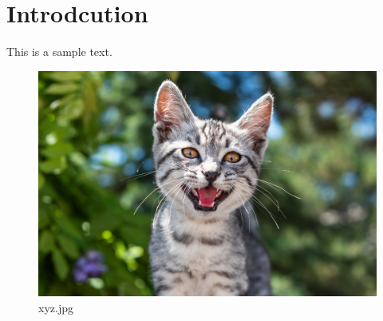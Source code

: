 \chapter{Introdcution}This is a sample text.
\begin{figure}[htpb]
\centering
\includegraphics[width=\textwidth,height=\textheight,keepaspectratio]{../../static/xyz.jpg}
\caption{xyz.jpg}
\end{figure}